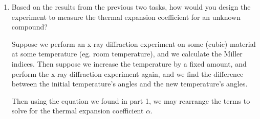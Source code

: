 \documentclass{article}
\begin{document}
\begin{enumerate}
    \item Based on the results from the previous two tasks, how would you design the experiment to measure the thermal expansion coefficient for an unknown compound?
    \newline
    
    Suppose we perform an x-ray diffraction experiment on some (cubic) material at some temperature (eg. room temperature), and we calculate the Miller indices. 
    Then suppose we increase the temperature by a fixed amount, and perform the x-ray diffraction experiment again, and we find the difference between the initial temperature's angles and the new temperature's angles. 
    
    Then using the equation we found in part 1, we may rearrange the terms to solve for the thermal expansion coefficient $\alpha$. 
    
\end{enumerate}
\end{document}
